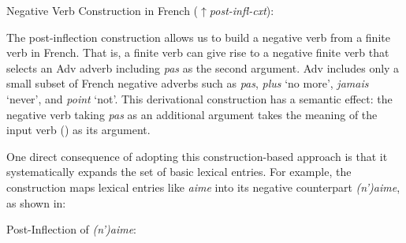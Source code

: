 \documentclass[output=paper]{langsci/langscibook}
\begin{document}
\be
\ex \label{neg-rule2} Negative Verb Construction in French ($\uparrow${\it post-infl-cxt}):\\
\ee




%
%
\noindent The post-inflection construction allows us
to build a negative verb from a finite verb in French.
That is, a finite verb can give rise to a negative finite
verb that selects an Adv
adverb including {\it pas} as the second
argument.
Adv includes only a small subset of French negative adverbs such
as \emph{pas}, \emph{plus} `no more', \emph{jamais} `never', and
\emph{point} `not'. This derivational construction has a semantic effect: the
negative verb taking \emph{pas} as an additional argument takes the meaning of
the input verb () as its argument.

One direct consequence of adopting this construction-based approach
is that it systematically expands the set of basic lexical entries.
For example, the construction maps lexical entries like
\emph{aime} into its negative counterpart \emph{(n')aime}, as shown
in:

\be
\ex Post-Inflection of {\it (n')aime}: \\
\ee
\end{document}
